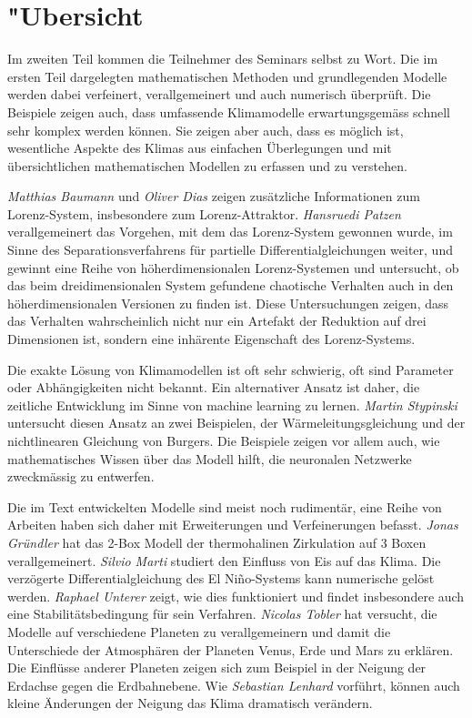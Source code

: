 %
%
%
\chapter*{"Ubersicht}
\rhead{}
\label{skript:uebersicht}
Im zweiten Teil kommen die Teilnehmer des Seminars selbst zu Wort.
Die im ersten Teil dargelegten mathematischen Methoden und
grundlegenden Modelle werden dabei verfeinert, verallgemeinert
und auch numerisch überprüft.
Die Beispiele zeigen auch, dass umfassende Klimamodelle erwartungsgemäss
schnell sehr komplex werden können.
Sie zeigen aber auch, dass es möglich ist, wesentliche Aspekte
des Klimas aus einfachen Überlegungen und mit übersichtlichen
mathematischen Modellen zu erfassen und zu verstehen.

{\em Matthias Baumann} und {\em Oliver Dias} zeigen zusätzliche
Informationen zum Lorenz-System, insbesondere zum Lorenz-Attraktor.
{\em Hansruedi Patzen} verallgemeinert das Vorgehen, mit dem das
Lorenz-System gewonnen wurde, im Sinne des Separationsverfahrens
für partielle Differentialgleichungen weiter, und gewinnt eine
Reihe von höherdimensionalen Lorenz-Systemen und untersucht,
ob das beim dreidimensionalen System gefundene chaotische Verhalten 
auch in den höherdimensionalen Versionen zu finden ist.
Diese Untersuchungen zeigen, dass das Verhalten wahrscheinlich
nicht nur ein Artefakt der Reduktion auf drei Dimensionen ist, sondern
eine inhärente Eigenschaft des Lorenz-Systems.

Die exakte Lösung von Klimamodellen ist oft sehr schwierig, oft sind
Parameter oder Abhängigkeiten nicht bekannt.
Ein alternativer Ansatz ist daher, die zeitliche Entwicklung
im Sinne von machine learning zu lernen.
{\em Martin Stypinski} untersucht diesen Ansatz an zwei Beispielen,
der Wärmeleitungsgleichung und der nichtlinearen Gleichung von Burgers.
Die Beispiele zeigen vor allem auch, wie mathematisches Wissen über das
Modell hilft, die neuronalen Netzwerke zweckmässig zu entwerfen.

Die im Text entwickelten Modelle sind meist noch rudimentär, eine
Reihe von Arbeiten haben sich daher mit Erweiterungen und Verfeinerungen
befasst.
{\em Jonas Gründler} hat das 2-Box Modell der thermohalinen Zirkulation
auf 3 Boxen verallgemeinert.
{\em Silvio Marti} studiert den Einfluss von Eis auf das Klima.
Die verzögerte Differentialgleichung des El Niño-Systems kann
numerische gelöst werden. {\em Raphael Unterer} zeigt, wie dies
funktioniert und findet insbesondere auch eine Stabilitätsbedingung
für sein Verfahren.
{\em Nicolas Tobler} hat versucht, die Modelle auf verschiedene
Planeten zu verallgemeinern und damit die Unterschiede der Atmosphären
der Planeten Venus, Erde und Mars zu erklären.
Die Einflüsse anderer Planeten zeigen sich zum Beispiel in der
Neigung der Erdachse gegen die Erdbahnebene.
Wie {\em Sebastian Lenhard} vorführt, können auch kleine Änderungen
der Neigung das Klima dramatisch verändern.

